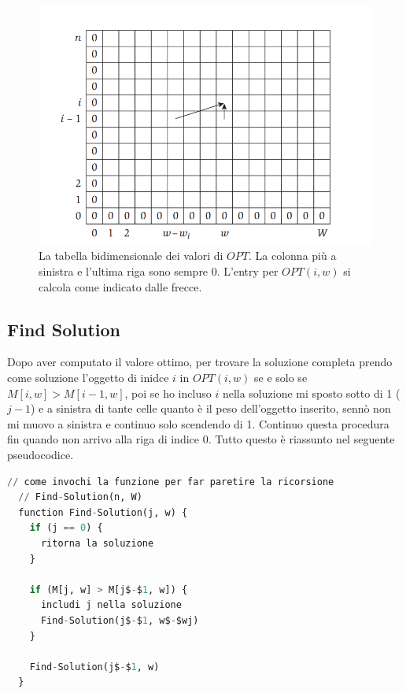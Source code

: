 \begin{figure}[H]
  \centering
  \includegraphics[width=\textwidth, keepaspectratio]{capitoli/programmazione_dinamica/imgs/knapsack_opt.png}
  \caption{La tabella bidimensionale dei valori di $OPT$.
    La colonna più a sinistra e l'ultima riga sono sempre 0. L'entry
    per $OPT(i, w)$ si calcola come indicato dalle frecce.}
\end{figure}


\subsection{Find Solution}

Dopo aver computato il valore ottimo, per trovare la soluzione completa
prendo come soluzione l'oggetto di inidce $i$ in $OPT(i, w)$ se e solo se
$M[i, w] > M[i-1, w]$,
poi se ho incluso $i$ nella soluzione mi sposto sotto di 1 ($j-1$) e a
sinistra di tante celle quanto è il peso dell'oggetto inserito, sennò non
mi muovo a sinistra e continuo solo scendendo di 1. Continuo questa
procedura fin quando non arrivo alla riga di indice 0. Tutto questo è
riassunto nel seguente pseudocodice.
\newpage
\begin{lstlisting}[language=Python, mathescape=true]
  // come invochi la funzione per far paretire la ricorsione
  // Find-Solution(n, W)
  function Find-Solution(j, w) {
    if (j == 0) {
      ritorna la soluzione
    }
  
    if (M[j, w] > M[j$-$1, w]) {
      includi j nella soluzione 
      Find-Solution(j$-$1, w$-$wj)
    }
  
    Find-Solution(j$-$1, w)
  }
\end{lstlisting}

